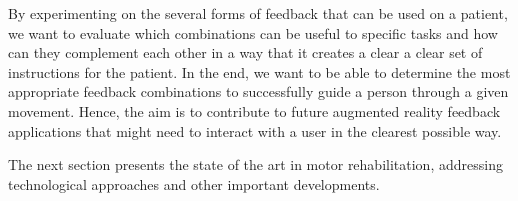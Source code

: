 By experimenting on the several forms of feedback that can be used on a patient, we want to evaluate which 
combinations can be useful to specific tasks and how can they complement each other 
in a way that it creates a clear a clear set of instructions for the patient. 
In the end, we want to be able to determine the most appropriate feedback combinations to successfully guide a person through a given movement.
Hence, the aim is to contribute to future augmented reality feedback applications that might need to interact with a user in the clearest possible way.

The next section presents the state of the art in motor rehabilitation, addressing technological approaches and other important developments.
 